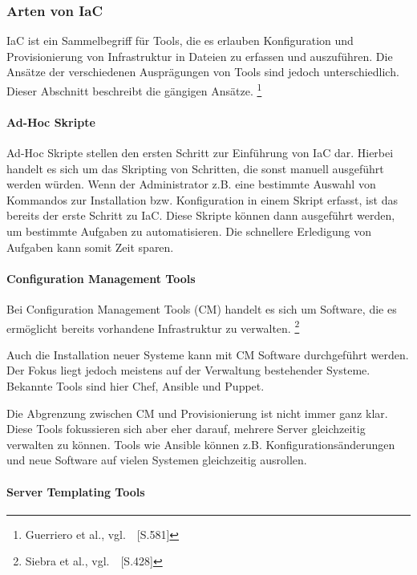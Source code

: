 \subsubsection{Arten von IaC}\label{iac_arten}

IaC ist ein Sammelbegriff für Tools, die es erlauben Konfiguration und Provisionierung von Infrastruktur in Dateien zu erfassen und auszuführen.
Die Ansätze der verschiedenen Ausprägungen von Tools sind jedoch unterschiedlich.
Dieser Abschnitt beschreibt die gängigen Ansätze.
\footnote{Guerriero et al., vgl.~\cite{Guerriero2019}~[S.581]}

\paragraph{Ad-Hoc Skripte}

Ad-Hoc Skripte stellen  den ersten Schritt zur Einführung von IaC dar.
Hierbei handelt es sich um das Skripting von Schritten, die sonst manuell ausgeführt werden würden.
Wenn der Administrator z.B. eine bestimmte Auswahl von Kommandos zur Installation bzw. Konfiguration in einem Skript erfasst, ist das bereits der erste Schritt zu IaC.
Diese Skripte können dann ausgeführt werden, um bestimmte Aufgaben zu automatisieren.
Die schnellere Erledigung von Aufgaben kann somit Zeit sparen.

\paragraph{Configuration Management Tools}

Bei Configuration Management Tools (CM) handelt es sich um Software, die es ermöglicht bereits vorhandene Infrastruktur zu verwalten.
\footnote{Siebra et al., vgl.~\cite{Siebra2019}~[S.428]}

Auch die Installation neuer Systeme kann mit CM Software durchgeführt werden.
Der Fokus liegt jedoch meistens auf der Verwaltung bestehender Systeme.
Bekannte Tools sind hier Chef, Ansible und Puppet.

Die Abgrenzung zwischen CM und Provisionierung ist nicht immer ganz klar.
Diese Tools fokussieren sich aber eher darauf, mehrere Server gleichzeitig verwalten zu können.
Tools wie Ansible können z.B. Konfigurationsänderungen und neue Software auf vielen Systemen gleichzeitig ausrollen.

\paragraph{Server Templating Tools}

